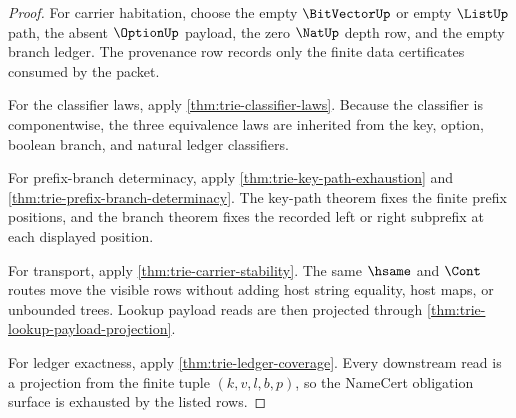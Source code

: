 \begin{proof}
For carrier habitation, choose the empty $\BitVectorUp$ or empty $\ListUp$
path, the absent $\OptionUp$ payload, the zero $\NatUp$ depth row, and the
empty branch ledger. The provenance row records only the finite data
certificates consumed by the packet.

For the classifier laws, apply \autoref{thm:trie-classifier-laws}. Because the
classifier is componentwise, the three equivalence laws are inherited from the
key, option, boolean branch, and natural ledger classifiers.

For prefix-branch determinacy, apply
\autoref{thm:trie-key-path-exhaustion} and
\autoref{thm:trie-prefix-branch-determinacy}. The key-path theorem fixes the
finite prefix positions, and the branch theorem fixes the recorded left or
right subprefix at each displayed position.

For transport, apply \autoref{thm:trie-carrier-stability}. The same $\hsame$
and $\Cont$ routes move the visible rows without adding host string equality,
host maps, or unbounded trees. Lookup payload reads are then projected through
\autoref{thm:trie-lookup-payload-projection}.

For ledger exactness, apply \autoref{thm:trie-ledger-coverage}. Every
downstream read is a projection from the finite tuple $(k,v,l,b,p)$, so the
NameCert obligation surface is exhausted by the listed rows.
\end{proof}
